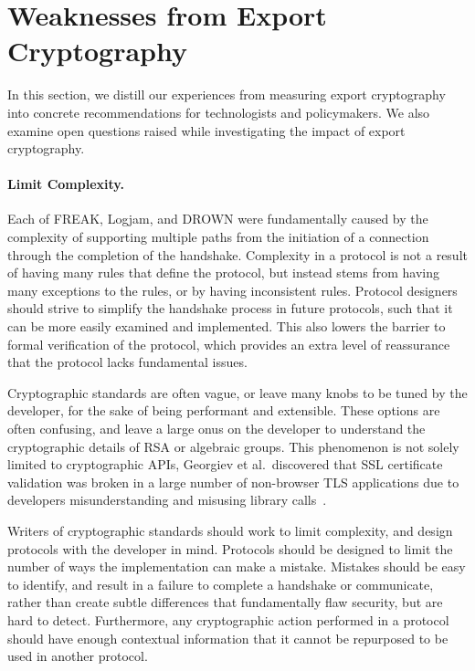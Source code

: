 \section{Weaknesses from Export Cryptography}

In this section, we distill our experiences from measuring export
cryptography into concrete recommendations for technologists and
policymakers. We also examine open questions raised while investigating the
impact of export cryptography.

\paragraph{Limit Complexity.}
Each of FREAK, Logjam, and DROWN were fundamentally caused by the complexity
of supporting multiple paths from the initiation of a connection through the
completion of the handshake. Complexity in a protocol is not a result of
having many rules that define the protocol, but instead stems from having
many exceptions to the rules, or by having inconsistent rules. Protocol
designers should strive to simplify the handshake process in future
protocols, such that it can be more easily examined and implemented. This
also lowers the barrier to formal verification of the protocol, which
provides an extra level of reassurance that the protocol lacks fundamental
issues.

Cryptographic standards are often vague, or leave many knobs to be tuned by
the developer, for the sake of being performant and extensible. These options
are often confusing, and leave a large onus on the developer to understand
the cryptographic details of RSA or algebraic groups. This phenomenon is not
solely limited to cryptographic APIs, Georgiev et al.\ discovered that SSL
certificate validation was broken in a large number of non-browser TLS
applications due to developers misunderstanding and misusing library
calls~\cite{most-dangerous-code-2012}.

Writers of cryptographic standards should work to limit complexity, and
design protocols with the developer in mind. Protocols should be designed to
limit the number of ways the implementation can make a mistake. Mistakes
should be easy to identify, and result in a failure to complete a handshake
or communicate, rather than create subtle differences that fundamentally flaw
security, but are hard to detect. Furthermore, any cryptographic action
performed in a protocol should have enough contextual information that it
cannot be repurposed to be used in another protocol.

